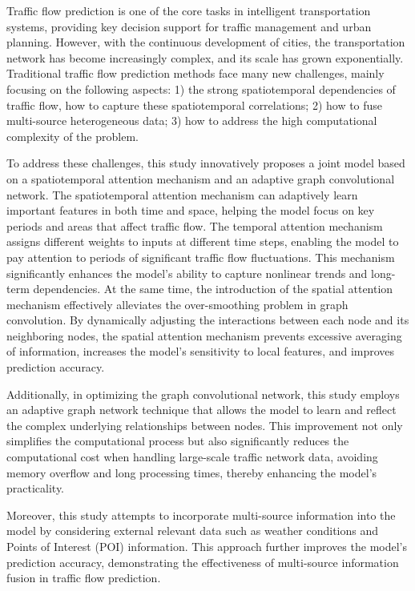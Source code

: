 \begin{abstract*}
  Traffic flow prediction is one of the core tasks in intelligent transportation systems, providing key decision support for traffic management and urban planning. However, with the continuous development of cities, the transportation network has become increasingly complex, and its scale has grown exponentially. Traditional traffic flow prediction methods face many new challenges, mainly focusing on the following aspects: 1) the strong spatiotemporal dependencies of traffic flow, how to capture these spatiotemporal correlations; 2) how to fuse multi-source heterogeneous data; 3) how to address the high computational complexity of the problem.

To address these challenges, this study innovatively proposes a joint model based on a spatiotemporal attention mechanism and an adaptive graph convolutional network. The spatiotemporal attention mechanism can adaptively learn important features in both time and space, helping the model focus on key periods and areas that affect traffic flow. The temporal attention mechanism assigns different weights to inputs at different time steps, enabling the model to pay attention to periods of significant traffic flow fluctuations. This mechanism significantly enhances the model's ability to capture nonlinear trends and long-term dependencies. At the same time, the introduction of the spatial attention mechanism effectively alleviates the over-smoothing problem in graph convolution. By dynamically adjusting the interactions between each node and its neighboring nodes, the spatial attention mechanism prevents excessive averaging of information, increases the model's sensitivity to local features, and improves prediction accuracy.

Additionally, in optimizing the graph convolutional network, this study employs an adaptive graph network technique that allows the model to learn and reflect the complex underlying relationships between nodes. This improvement not only simplifies the computational process but also significantly reduces the computational cost when handling large-scale traffic network data, avoiding memory overflow and long processing times, thereby enhancing the model's practicality.

Moreover, this study attempts to incorporate multi-source information into the model by considering external relevant data such as weather conditions and Points of Interest (POI) information. This approach further improves the model's prediction accuracy, demonstrating the effectiveness of multi-source information fusion in traffic flow prediction.


\end{abstract*}
